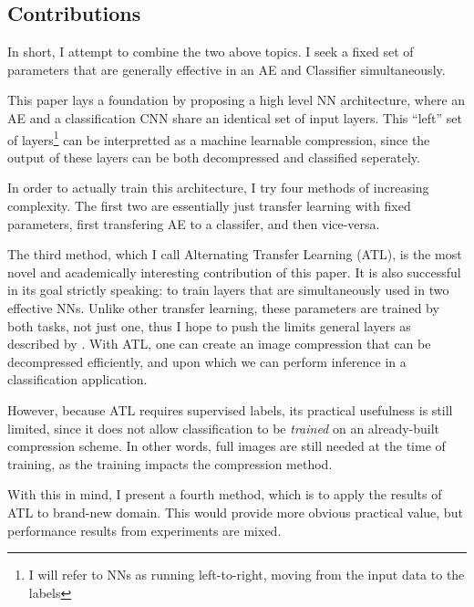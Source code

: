 \documentclass[twoside,11pt]{article}
\begin{document}
\subsection{Contributions}

In short, I attempt to combine the two above topics. I seek a fixed set of parameters that are
generally effective in an AE and Classifier simultaneously. 

This paper lays a foundation by proposing
a high level NN architecture, where an AE and a classification CNN
share an identical set of input layers. This ``left'' set of layers\footnote{I 
will refer to NNs as running 
left-to-right, moving from the input data to the labels}
can be interpretted as a machine learnable compression, since the output of these
layers can be both decompressed and classified seperately. 

In order to actually train this architecture, I try four methods of increasing complexity.
The first two are essentially just transfer learning with fixed parameters, first
transfering AE to a classifer, and then vice-versa.

The third method, which I call Alternating Transfer Learning (ATL), is the most novel 
and academically interesting contribution of this paper.
It is also successful in its goal strictly speaking: to train layers 
that are simultaneously used in two effective NNs. Unlike other transfer learning,
these parameters are trained by both tasks, not just one,
thus I hope to push the limits general layers as described by \cite{yosinski2014transferable}.
With ATL, one can create an image compression
that can be decompressed efficiently, and upon which we can perform inference in a 
classification application. 

However, because ATL requires supervised labels, its practical usefulness is still limited,
since it does not allow classification to be \emph{trained} on an already-built compression scheme.
In other words, full images are still needed at the time of training, as the training 
impacts the compression method. 

With this in mind, I present a fourth method, which is to apply the results of ATL to brand-new
domain. This would provide more obvious practical value, but performance results 
from experiments are mixed.

\end{document}
